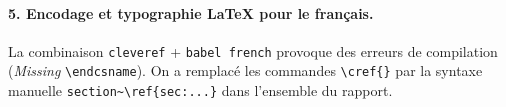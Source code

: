 \paragraph{5. Encodage et typographie \LaTeX{} pour le fran\c{c}ais.}
La combinaison \texttt{cleveref} + \texttt{babel french} provoque des erreurs
de compilation (\textit{Missing} \texttt{\textbackslash endcsname}). On a
remplac\'e les commandes \texttt{\textbackslash cref\{\}} par la syntaxe
manuelle \texttt{section\~{}\textbackslash ref\{sec:...\}} dans l'ensemble
du rapport.
